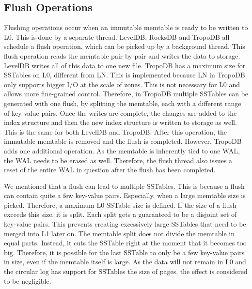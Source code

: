 \subsection{Flush Operations}
Flushing operations occur when an immutable memtable is ready to be written to L0. This is done by a separate thread. LevelDB, RocksDB and TropoDB all schedule a flush operation, which can be picked up by a background thread. This flush operation reads the memtable pair by pair and writes the data to storage. LevelDB writes all of this data to one new file. TropoDB has a maximum size for SSTables on L0, different from LN. This is implemented because LN in TropoDB only supports bigger I/O at the scale of zones. This is not necessary for L0 and allows more fine-grained control. Therefore, in TropoDB multiple SSTables can be generated with one flush, by splitting the memtable, each with a different range of key-value pairs. Once the writes are complete, the changes are added to the index structure and then the new index structure is written to storage as well. This is the same for both LevelDB and TropoDB. After this operation, the immutable memtable is removed and the flush is completed. However, TropoDB adds one additional operation. As the memtable is inherently tied to one WAL, the WAL needs to be erased as well. Therefore, the flush thread also issues a reset of the entire WAL in question after the flush has been completed.

We mentioned that a flush can lead to multiple SSTables. This is because a flush can contain quite a few key-value pairs. Especially, when a large memtable size is picked. Therefore, a maximum L0 SSTable size is defined. If the size of a flush exceeds this size, it is split. Each split gets a guaranteed to be a disjoint set of key-value pairs. This prevents creating excessively large SSTables that need to be merged into L1 later on. The memtable split does not divide the memtable in equal parts. Instead, it cuts the SSTable right at the moment that it becomes too big. Therefore, it is possible for the last SSTable to only be a few key-value pairs in size, even if the memtable itself is large. As the data will not remain in L0 and the circular log has support for SSTables the size of pages, the effect is considered to be negligible. 

